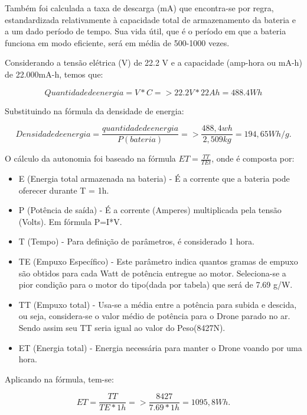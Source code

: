 Também foi calculada a taxa de descarga (mA) que encontra-se por regra, estandardizada relativamente à capacidade total de armazenamento da bateria e a um dado período de tempo. Sua vida útil, que é o período em que a bateria funciona em modo eficiente, será em média de 500-1000 vezes.

Considerando a tensão elétrica (V) de  22.2 V e a capacidade (amp-hora ou mA-h) de 22.000mA-h, temos que: 

\begin{equation}
Quantidade de energia = V*C => 22.2V * 22Ah = 488.4Wh
\end{equation}

Substituindo na fórmula da densidade de energia: 

\begin{equation}
Densidade de energia = \frac{quantidade de energia}{P(bateria)} => \frac{488,4wh}{2,509kg} = 194,65 Wh/g.
\end{equation}

O cálculo da autonomia foi baseado na fórmula $ET=\frac{TT}{TEt}$, onde é composta por:

\begin{itemize}
\item E (Energia total armazenada na bateria) - É a corrente que a bateria pode oferecer durante T = 1h.
\item P (Potência de saída) - É a corrente (Amperes) multiplicada pela tensão (Volts). Em fórmula P=I*V.
\item T (Tempo) - Para definição de parâmetros, é considerado 1 hora.
\item TE (Empuxo Específico) - Este parâmetro indica quantos gramas de empuxo são obtidos para cada Watt de potência entregue ao motor. Seleciona-se a pior condição para o motor do tipo(dada por tabela) que será de 7.69 g/W.
\item TT (Empuxo total) - Usa-se a média entre a potência para subida e descida, ou seja, considera-se o valor médio de potência para o Drone parado no ar. Sendo assim seu TT seria igual ao valor do Peso(8427N).  
\item ET (Energia total) - Energia necessária para manter o Drone voando por uma hora. 
\end{itemize}

Aplicando na fórmula, tem-se:

\begin{equation}
ET=\frac{TT}{TE*1h} => \frac{8427}{7.69*1h} = 1095,8 Wh.
\end{equation}

